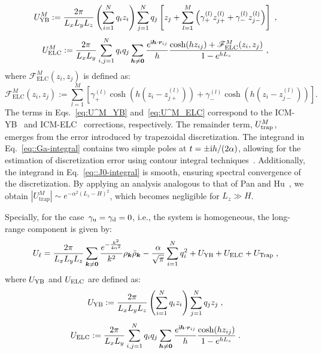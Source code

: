 \begin{equation}\label{eq:U^M_YB}
U_{\text{YB}}^{M}:=\frac{2\pi}{L_xL_yL_z}\left(\sum_{i=1}^{N}q_{i}z_{i}\right)\sum_{j=1}^{N}q_j\left[z_{j}+\sum_{l=1}^{M}\left(\gamma_{+}^{(l)}z_{j+}^{(l)}+\gamma_{-}^{(l)}z_{j-}^{(l)}\right)\right]\;,
\end{equation}
\begin{equation}\label{eq:U^M_ELC}
U_{\text{ELC}}^{M}:=\frac{2\pi}{L_xL_y}\sum_{i,j=1}^{N}q_iq_j\sum_{\bm{h}\neq \bm{0}} \frac{e^{\mathsf i \bm{h}\cdot\bm{r}_{ij}}}{h}\frac{\cosh(hz_{ij})+\mathscr{F}_{\text{ELC}}^M(z_i,z_j)}{1-e^{hL_z}}\;,
\end{equation}
where $\mathscr{F}_{\text{ELC}}^M(z_i,z_j)$ is defined as:
\begin{equation}\label{eq::23}
\mathscr{F}_{\text{ELC}}^M(z_i,z_j):=\sum\limits_{l=1}^{M}\left[\gamma_{+}^{(l)}\cosh(h(z_i-z_{j+}^{(l)}))+\gamma_{-}^{(l)}\cosh(h(z_i-z_{j-}^{(l)}))\right].
\end{equation}
The terms in Eqs.~\eqref{eq:U^M_YB} and~\eqref{eq:U^M_ELC} correspond to the ICM-YB~\cite{yuan2021particle} and ICM-ELC~\cite{tyagi2008electrostatic} corrections, respectively. 
The remainder term, $U^{M}_{\text{trap}}$, emerges from the error introduced by trapezoidal discretization. 
The integrand in Eq.~\eqref{eq::Ga-integral} contains two simple poles at $t=\pm {\text{i}}h/(2\alpha)$, allowing for the estimation of discretization error using contour integral techniques~\cite{trefethen2014Rev}. 
Additionally, the integrand in Eq.~\eqref{eq::J0-integral} is smooth, %
ensuring spectral convergence of the discretization. 
By applying an analysis analogous to that of Pan and Hu~\cite{pan2014rigorous}, we obtain $|U_{\text{trap}}^{M}|\sim e^{-\alpha^2(L_z-H)^2}$, which becomes negligible for $L_z \gg H$.  

Specially, for the case~$\gamma_{\text{u}}=\gamma_{\text{d}}=0$, i.e., the system is homogeneous, the long-range component is given by:
\begin{equation}\label{eq::U3D_Four}
	\begin{split}
		U_{\ell} = \frac{2\pi}{L_xL_yL_z}\sum_{\bm{k}\neq \bm{0}}\frac{e^{-\frac{k^2}{4\alpha^2}}}{k^2}\rho_{\bm{k}}\bar{\rho}_{\bm{k}} - \frac{\alpha}{\sqrt{\pi}}\sum_{i=1}^{N}q_i^2+ U_{\text{YB}} + U_{\text{ELC}} + U_{\text{Trap}}\;,
	\end{split}
\end{equation}
where $U_{\text{YB}}$ and $U_{\text{ELC}}$ are defined as:
\begin{equation}\label{eq::U3D_YB}
	U_{\text{YB}} := \frac{2\pi}{L_xL_yL_z}\left(\sum_{i=1}^{N}q_{i}z_{i}\right)\sum_{j=1}^{N}q_j z_{j}\;,
\end{equation}
\begin{equation}\label{eq::U3D_ELC}
	U_{\text{ELC}} := \frac{2\pi}{L_xL_y}\sum_{i,j=1}^{N}q_iq_j\sum_{\bm{h}\neq \bm{0}} \frac{e^{\mathsf i \bm{h}\cdot\bm{r}_{ij}}}{h}\frac{\cosh(hz_{ij})}{1-e^{hL_z}}\;.
\end{equation}


